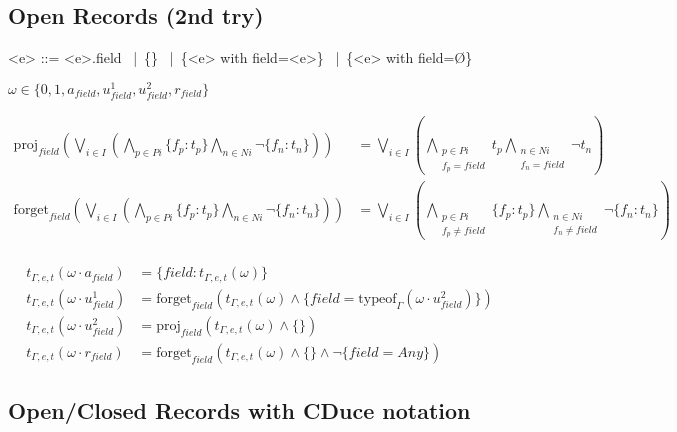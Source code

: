 \documentclass[a4paper]{article}%
\newcommand{\alt}{~|~}
\begin{document}
    \subsection{Open Records (2nd try)}

    \begin{grammar}
        \let\syntleft\relax
        \let\syntright\relax
        <e> ::= <e>.field \alt \{\} \alt \{<e> with field=<e>\} \alt \{<e> with field=\O\}
    \end{grammar}

    $ \omega \in \{0,1,a_{field},u_{field}^1,u_{field}^2,r_{field}\} $

    \begin{align*}
        \text{proj}_{field}(\bigvee\limits_{i \in I}
        (\bigwedge\limits_{p \in Pi} \{f_p:t_p\} \bigwedge\limits_{n \in Ni} \neg \{f_n:t_n\}))
        &= \bigvee\limits_{i \in I}
        (\bigwedge\limits_{\substack{p \in Pi \\ f_p = field}} t_p \bigwedge\limits_{\substack{n \in Ni \\ f_n = field}} \neg t_n)\\
        \text{forget}_{field}(\bigvee\limits_{i \in I}
        (\bigwedge\limits_{p \in Pi} \{f_p:t_p\} \bigwedge\limits_{n \in Ni} \neg \{f_n:t_n\}))
        &= \bigvee\limits_{i \in I}
        (\bigwedge\limits_{\substack{p \in Pi \\ f_p \neq field}} \{f_p:t_p\} \bigwedge\limits_{\substack{n \in Ni \\ f_n \neq field}} \neg \{f_n:t_n\})\\
    \end{align*}

    \begin{align*}
        t_{\Gamma,e,t}(\omega\cdot a_{field}) &= \{ field: t_{\Gamma,e,t}(\omega) \}\\
        t_{\Gamma,e,t}(\omega\cdot u_{field}^1) &= \text{forget}_{field}(t_{\Gamma,e,t}(\omega) \land \{field=\text{typeof}_{\Gamma}(\omega \cdot u_{field}^2)\})\\
        t_{\Gamma,e,t}(\omega\cdot u_{field}^2) &= \text{proj}_{field}(t_{\Gamma,e,t}(\omega) \land \{\})\\
        t_{\Gamma,e,t}(\omega\cdot r_{field}) &= \text{forget}_{field}(t_{\Gamma,e,t}(\omega) \land \{\} \land \neg \{field=Any\})
    \end{align*}

    \subsection{Open/Closed Records with CDuce notation}
\end{document}
